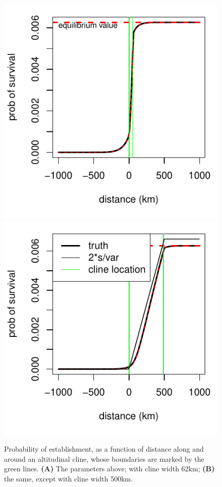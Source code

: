 \begin{figure}[ht!!]
  \begin{center}
    \includegraphics{prob-estab-62}
    \includegraphics{prob-estab-500}
  \end{center}
  \caption{
  Probability of establishment, as a function of distance along and around an altitudinal cline, whose boundaries are marked by the green lines.
  {\bf (A)} The parameters above; with cline width 62km; {\bf (B)} the same, except with cline width 500km.
  \label{sfig:prob_estab}
  }
\end{figure}


